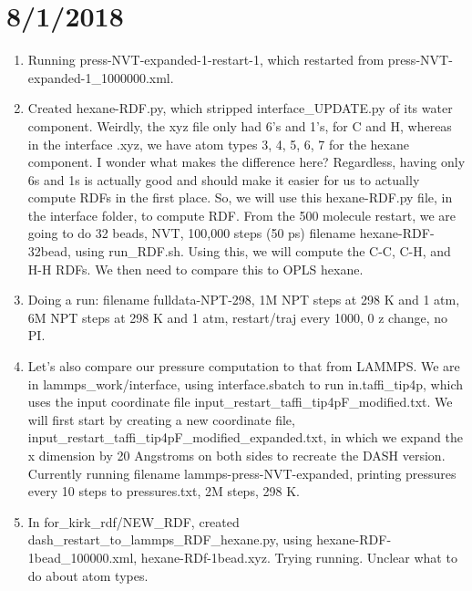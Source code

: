 \documentclass[12pt,reqno]{amsart}
\numberwithin{equation}{section}
\begin{document}
\section{8/1/2018}
\begin{enumerate}
\item Running press-NVT-expanded-1-restart-1, which restarted from press-NVT-expanded-1\_1000000.xml.  
\item Created hexane-RDF.py, which stripped interface\_UPDATE.py of its water component.  Weirdly, the xyz file only had 6's and 1's, for C and H, whereas in the interface .xyz, we have atom types 3, 4, 5, 6, 7 for the hexane component.  I wonder what makes the difference here?  Regardless, having only 6s and 1s is actually good and should make it easier for us to actually compute RDFs in the first place.  So, we will use this hexane-RDF.py file, in the interface folder, to compute RDF.  From the 500 molecule restart, we are going to do 32 beads, NVT, 100,000 steps (50 ps) filename hexane-RDF-32bead, using run\_RDF.sh.  Using this, we will compute the C-C, C-H, and H-H RDFs.  We then need to compare this to OPLS hexane.  
\item Doing a run: filename fulldata-NPT-298, 1M NPT steps at 298 K and 1 atm, 6M NPT steps at 298 K and 1 atm, restart/traj every 1000, 0 z change, no PI.  
\item Let's also compare our pressure computation to that from LAMMPS.  We are in lammps\_work/interface, using interface.sbatch to run in.taffi\_tip4p, which uses the input coordinate file input\_restart\_taffi\_tip4pF\_modified.txt.  We will first start by creating a new coordinate file, input\_restart\_taffi\_tip4pF\_modified\_expanded.txt, in which we expand the x dimension by 20 Angstroms on both sides to recreate the DASH version.  Currently running filename  lammps-press-NVT-expanded, printing pressures every 10 steps to pressures.txt, 2M steps, 298 K.  
\item In for\_kirk\_rdf/NEW\_RDF, created dash\_restart\_to\_lammps\_RDF\_hexane.py, using hexane-RDF-1bead\_100000.xml, hexane-RDf-1bead.xyz.  Trying running.  Unclear what to do about atom types.  
\end{enumerate}
\end{document}
